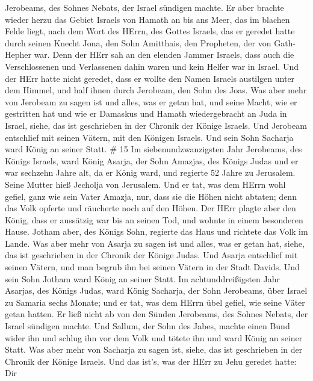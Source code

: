 Jerobeams, des Sohnes Nebats, der Israel sündigen machte. 
Er aber brachte wieder herzu das Gebiet Israels von Hamath an bis ans
Meer, das im blachen Felde liegt, nach dem Wort des HErrn, des Gottes
Israels, das er geredet hatte durch seinen Knecht Jona, den Sohn
Amitthais, den Propheten, der von Gath-Hepher war.  Denn
der HErr sah an den elenden Jammer Israels, dass auch die Verschlossenen
und Verlassenen dahin waren und kein Helfer war in Israel. 
Und der HErr hatte nicht geredet, dass er wollte den Namen Israels
austilgen unter dem Himmel, und half ihnen durch Jerobeam, den Sohn des
Joas.  Was aber mehr von Jerobeam zu sagen ist und alles,
was er getan hat, und seine Macht, wie er gestritten hat und wie er
Damaskus und Hamath wiedergebracht an Juda in Israel, siehe, das ist
geschrieben in der Chronik der Könige Israels.  Und
Jerobeam entschlief mit seinen Vätern, mit den Königen Israels. Und sein
Sohn Sacharja ward König an seiner Statt. \# 15  Im
siebenundzwanzigsten Jahr Jerobeams, des Königs Israels, ward König
Asarja, der Sohn Amazjas, des Königs Judas  und er war
sechzehn Jahre alt, da er König ward, und regierte 52 Jahre zu
Jerusalem. Seine Mutter hieß Jecholja von Jerusalem.  Und er
tat, was dem HErrn wohl gefiel, ganz wie sein Vater Amazja, 
nur, dass sie die Höhen nicht abtaten; denn das Volk opferte und
räucherte noch auf den Höhen.  Der HErr plagte aber den
König, dass er aussätzig war bis an seinen Tod, und wohnte in einem
besonderen Hause. Jotham aber, des Königs Sohn, regierte das Haus und
richtete das Volk im Lande.  Was aber mehr von Asarja zu
sagen ist und alles, was er getan hat, siehe, das ist geschrieben in der
Chronik der Könige Judas.  Und Asarja entschlief mit seinen
Vätern, und man begrub ihn bei seinen Vätern in der Stadt Davids. Und
sein Sohn Jotham ward König an seiner Statt.  Im
achtunddreißigsten Jahr Asarjas, des Königs Judas, ward König Sacharja,
der Sohn Jerobeams, über Israel zu Samaria sechs Monate; 
und er tat, was dem HErrn übel gefiel, wie seine Väter getan hatten. Er
ließ nicht ab von den Sünden Jerobeams, des Sohnes Nebats, der Israel
sündigen machte.  Und Sallum, der Sohn des Jabes, machte
einen Bund wider ihn und schlug ihn vor dem Volk und tötete ihn und ward
König an seiner Statt.  Was aber mehr von Sacharja zu sagen
ist, siehe, das ist geschrieben in der Chronik der Könige Israels.
 Und das ist's, was der HErr zu Jehu geredet hatte: Dir
